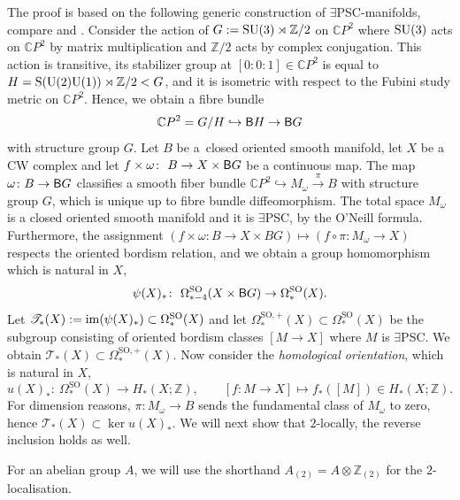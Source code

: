 \documentclass[pdftex]{sigma}
\numberwithin{equation}{section}
\newcommand{\Z}{\mathbb{Z}}
\newcommand{\C}{\mathbb{C}}
\newcommand{\SO}{\mathrm{SO}}
\newcommand{\SU}{\rm SU}
\newcommand{\sB}{{\sf B}}
\newcommand{\im}{{\rm im}}
\newcommand{\yes}{{\color {blue!70!black}$\exists$}{\sf PSC}}
\begin{document}
The proof is based on the following generic construction of \yes-manifolds, compare \cite{Stolz92} and \cite{Fuehring}.
Consider the action of $G := \SU(3) \rtimes \Z/2$ on $\C P^2$ where $\SU(3)$ acts on $\C P^2$ by matrix multiplication and $\Z/2$ acts by complex conjugation.
This action is transitive, its stabilizer group at $[0:0:1] \in \C P^2$ is equal to $H = {\rm S}({\rm U}(2) {\rm U}(1)) \rtimes \Z/2 < G$, and it is isometric with respect to the Fubini study metric on $\C P^2$.
Hence, we obtain a fibre bundle
\begin{equation} \label{universal}
 \C P^2 = G/ H \hookrightarrow \sB H \to \sB G
\end{equation}
with structure group $G$.
Let $B$ be a~closed oriented smooth manifold, let $X$ be a CW complex and let $
 f \times \omega \colon\ B \to X \times \sB G
$
be a continuous map.
The map $\omega \colon B \to \sB G$ classifies a smooth fiber bundle $\C P^2 \hookrightarrow M_{\omega} \stackrel{\pi}{\longrightarrow} B$ with structure group $G$, which is unique up to fibre bundle diffeomorphism.
The total space $M_{\omega}$ is a closed oriented smooth manifold and it is \yes, by the O'Neill formula.
Furthermore, the assignment $(f \times \omega \colon B \to X \times BG) \mapsto (f \circ \pi \colon M_\omega \to X)$ respects the oriented bordism relation, and we obtain a group homomorphism which is natural in $X$,
\begin{equation} \label{psi}
 \psi(X)_* \colon\ \Omega^{\SO}_{*-4} (X \times \sB G) \to \Omega^{\SO}_{*}(X).
\end{equation}
Let $\mathscr{T}_*(X) := \im ( \psi(X)_*) \subset \Omega^{\SO}_{*}(X)$ and let $ \Omega^{\SO, +}_*( X) \subset \Omega_*^{\SO}(X)$ be the subgroup consisting of oriented bordism classes $[M \to X]$ where $M$ is \yes.
We obtain
$
 \mathscr{T}_*(X) \subset \Omega^{\SO,+}_*(X)$.
Now consider the {\em homological orientation}, which is natural in $X$,
\begin{equation} \label{homor}
 u(X)_* \colon\ \Omega^{\SO}_*(X) \to H_*(X; \Z), \qquad [f \colon M \to X] \mapsto f_*([M]) \in H_*(X; \Z).
\end{equation}
For dimension reasons, $\pi \colon M_\omega \to B$ sends the fundamental class of $M_\omega$ to zero, hence
$
 \mathscr{T}_*(X) \subset \ker u(X)_*$.
We will next show that $2$-locally, the reverse inclusion holds as well.

For an abelian group $A$, we will use the shorthand $A_{(2)} = A \otimes \Z_{(2)}$ for the $2$-localisation.
\end{document}
